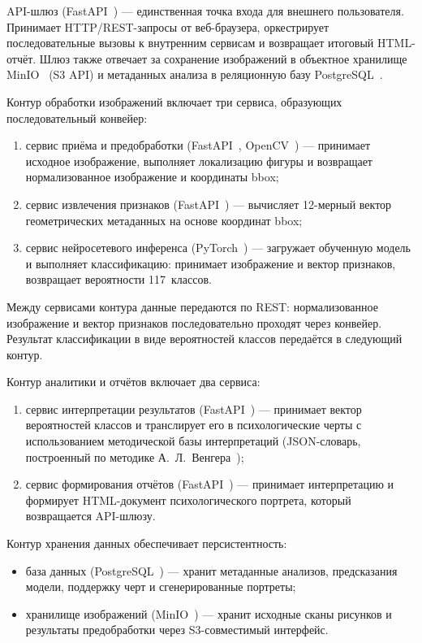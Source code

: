 API-шлюз (FastAPI~\cite{fastapi}) --- единственная точка входа для внешнего пользователя. Принимает HTTP/REST-запросы от веб-браузера, оркестрирует последовательные вызовы к внутренним сервисам и возвращает итоговый HTML-отчёт. Шлюз также отвечает за сохранение изображений в объектное хранилище MinIO~\cite{minio} (S3 API) и метаданных анализа в реляционную базу PostgreSQL~\cite{postgres}.

Контур обработки изображений включает три сервиса, образующих последовательный конвейер:

\begin{enumerate}
    \item сервис приёма и предобработки (FastAPI~\cite{fastapi}, OpenCV~\cite{opencv}) --- принимает исходное изображение, выполняет локализацию фигуры и возвращает нормализованное изображение и координаты bbox;
    \item сервис извлечения признаков (FastAPI~\cite{fastapi}) --- вычисляет 12-мерный вектор геометрических метаданных на основе координат bbox;
    \item сервис нейросетевого инференса (PyTorch~\cite{pytorch}) --- загружает обученную модель и выполняет классификацию: принимает изображение и вектор признаков, возвращает вероятности 117~классов.
\end{enumerate}

Между сервисами контура данные передаются по REST: нормализованное изображение и вектор признаков последовательно проходят через конвейер. Результат классификации в виде вероятностей классов передаётся в следующий контур.

Контур аналитики и отчётов включает два сервиса:

\begin{enumerate}
    \item сервис интерпретации результатов (FastAPI~\cite{fastapi}) --- принимает вектор вероятностей классов и транслирует его в психологические черты с использованием методической базы интерпретаций (JSON-словарь, построенный по методике А.~Л.~Венгера~\cite{venger});
    \item сервис формирования отчётов (FastAPI~\cite{fastapi}) --- принимает интерпретацию и формирует HTML-документ психологического портрета, который возвращается API-шлюзу.
\end{enumerate}

Контур хранения данных обеспечивает персистентность:

\begin{itemize}
    \item база данных (PostgreSQL~\cite{postgres}) --- хранит метаданные анализов, предсказания модели, поддержку черт и сгенерированные портреты;
    \item хранилище изображений (MinIO~\cite{minio}) --- хранит исходные сканы рисунков и результаты предобработки через S3-совместимый интерфейс.
\end{itemize}

